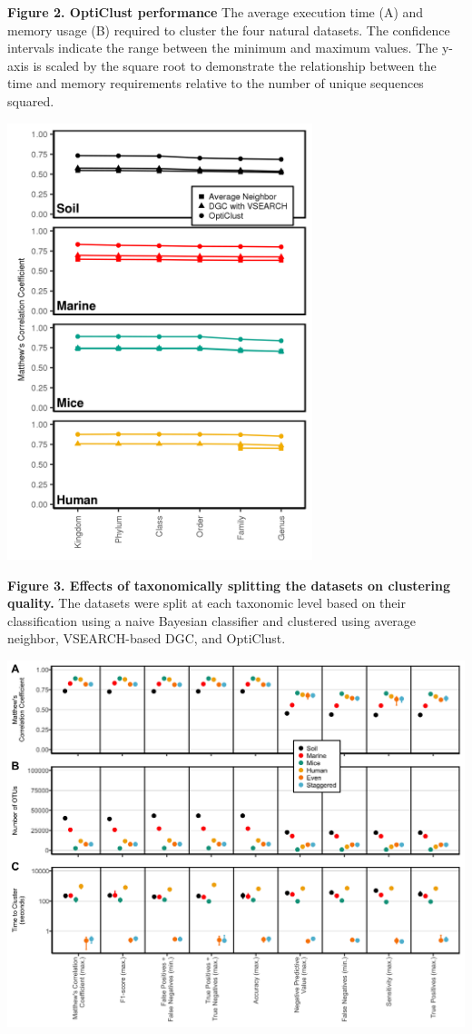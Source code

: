 \documentclass[11pt,]{article}
\begin{document}
\textbf{Figure 2. OptiClust performance} The average execution time (A)
and memory usage (B) required to cluster the four natural datasets. The
confidence intervals indicate the range between the minimum and maximum
values. The y-axis is scaled by the square root to demonstrate the
relationship between the time and memory requirements relative to the
number of unique sequences squared.

\newpage

\includegraphics[width=3.5in]{../results/figures/split_mcc.png}

\textbf{Figure 3. Effects of taxonomically splitting the datasets on
clustering quality.} The datasets were split at each taxonomic level
based on their classification using a naive Bayesian classifier and
clustered using average neighbor, VSEARCH-based DGC, and OptiClust.

\newpage

\includegraphics[width=6.0in]{../results/figures/performance_other.png}
\end{document}
